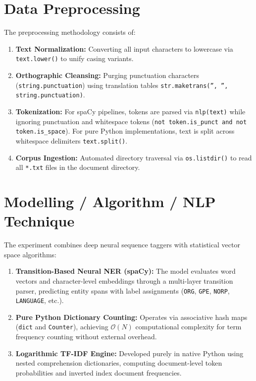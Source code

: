 \documentclass[12pt,a4paper]{report}
\begin{document}
\section{Data Preprocessing}
The preprocessing methodology consists of:
\begin{enumerate}
    \item \textbf{Text Normalization:} Converting all input characters to lowercase via \texttt{text.lower()} to unify casing variants.
    \item \textbf{Orthographic Cleansing:} Purging punctuation characters (\texttt{string.punctuation}) using translation tables \texttt{str.maketrans('', '', string.punctuation)}.
    \item \textbf{Tokenization:} For spaCy pipelines, tokens are parsed via \texttt{nlp(text)} while ignoring punctuation and whitespace tokens (\texttt{not token.is\_punct and not token.is\_space}). For pure Python implementations, text is split across whitespace delimiters \texttt{text.split()}.
    \item \textbf{Corpus Ingestion:} Automated directory traversal via \texttt{os.listdir()} to read all \texttt{*.txt} files in the document directory.
\end{enumerate}

\section{Modelling / Algorithm / NLP Technique}
The experiment combines deep neural sequence taggers with statistical vector space algorithms:
\begin{enumerate}
    \item \textbf{Transition-Based Neural NER (spaCy):} The model evaluates word vectors and character-level embeddings through a multi-layer transition parser, predicting entity spans with label assignments (\texttt{ORG}, \texttt{GPE}, \texttt{NORP}, \texttt{LANGUAGE}, etc.).
    \item \textbf{Pure Python Dictionary Counting:} Operates via associative hash maps (\texttt{dict} and \texttt{Counter}), achieving $\mathcal{O}(N)$ computational complexity for term frequency counting without external overhead.
    \item \textbf{Logarithmic TF-IDF Engine:} Developed purely in native Python using nested comprehension dictionaries, computing document-level token probabilities and inverted index document frequencies.
\end{enumerate}
\end{document}
